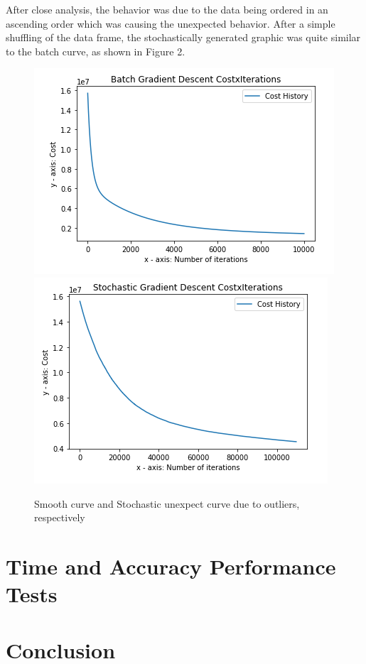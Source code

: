 \documentclass[conference]{IEEEtran}
\begin{document}
    After close analysis, the behavior was due to the data being ordered in an ascending order which was causing the unexpected behavior. After a simple shuffling of the data frame, the stochastically generated graphic was quite similar to the batch curve, as shown in Figure 2.
	
  \begin{figure}[!h]
      \centering
      \includegraphics[scale=0.28]{images/smooth-gd-curve.png}
      \includegraphics[scale=0.28]{images/smoother-curves-in-stochastic-gd.png}
      \caption{Smooth curve and Stochastic unexpect curve due to outliers, respectively}
      \label{fig1}
  \end{figure}
	
\section{Time and Accuracy Performance Tests}
	
	

\section{Conclusion}

\begin{thebibliography}{00}


\end{thebibliography}
\end{document}
